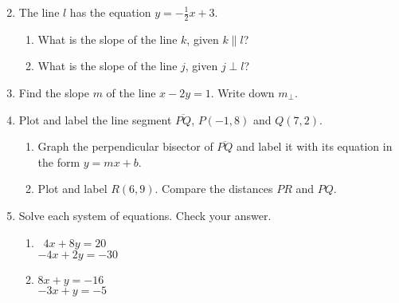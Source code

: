 \begin{enumerate}
\begin{enumerate}
\begin{multicols}{2}
  \end{multicols}
\end{enumerate} \vspace{1cm}

\item The line $l$ has the equation $y=-\frac{1}{2} x+3$.
\begin{enumerate}
  \item What is the slope of the line $k$, given $k \parallel l$?
  \vspace{1.3cm}
  \item What is the slope of the line $j$, given $j \perp l$?
  \vspace{1.3cm}
\end{enumerate}

\item Find the slope $m$ of the line $x-2y=1$. Write down $m_{\perp}$.  \vspace{2cm}

\newpage
\item Plot and label the line segment $\overline{PQ}$, $P(-1,8)$ and $Q(7,2)$.
  \begin{enumerate}
    \item Graph the perpendicular bisector of $\overline{PQ}$ and label it with its equation in the form $y=mx+b$.  \vspace{1cm} 
    \item Plot and label $R(6,9)$. Compare the distances $PR$ and $PQ$.
  \end{enumerate} 
  \begin{flushright} %
  \end{flushright}

\item Solve each system of equations. Check your answer.
  \begin{multicols}{2}
    \begin{enumerate}
      \item \, $4x+8y=20$\\
      $-4x+2y=-30$
      \item \quad $8x+y=-16$\\
      $-3x+y=-5$
    \end{enumerate}
  \end{multicols}


\end{enumerate}
